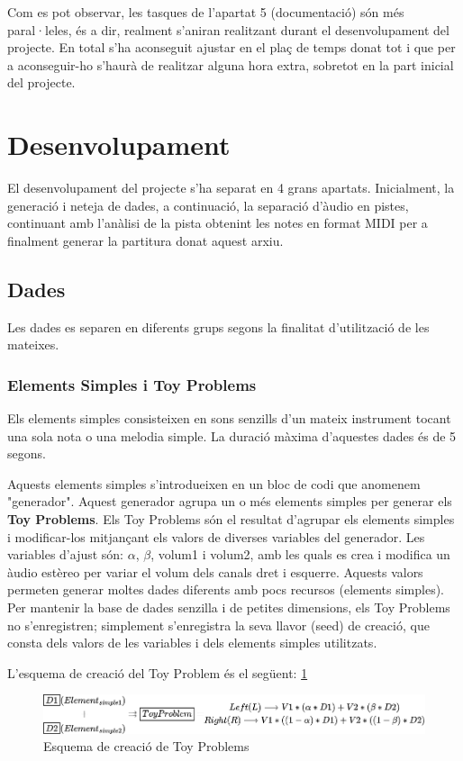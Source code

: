 \documentclass[10pt,a4paper,twocolumn,twoside]{article}
\begin{document}
Com es pot observar, les tasques de l'apartat 5 (documentació) són més paral·leles, és a dir, realment s'aniran realitzant durant el desenvolupament del projecte.
En total s'ha aconseguit ajustar en el plaç de temps donat tot i que per a aconseguir-ho s'haurà de realitzar alguna hora extra, sobretot en la part inicial del projecte.

\section{Desenvolupament}

El desenvolupament del projecte s'ha separat en 4 grans apartats. Inicialment, la generació i neteja de dades, a continuació, la separació d'àudio en pistes, continuant amb l'anàlisi de la pista obtenint les notes en format MIDI per a finalment generar la partitura donat aquest arxiu.

\subsection{Dades}
Les dades es separen en diferents grups segons la finalitat d'utilització de les mateixes.

\subsubsection{Elements Simples i Toy Problems}

Els elements simples consisteixen en sons senzills d'un mateix instrument tocant una sola nota o una melodia simple. La duració màxima d'aquestes dades és de 5 segons.

Aquests elements simples s'introdueixen en un bloc de codi que anomenem "generador". Aquest generador agrupa un o més elements simples per generar els \textbf{Toy Problems}. Els Toy Problems són el resultat d'agrupar els elements simples i modificar-los mitjançant els valors de diverses variables del generador. Les variables d'ajust són: \(\alpha\), \(\beta\), volum1 i volum2, amb les quals es crea i modifica un àudio estèreo per variar el volum dels canals dret i esquerre. Aquests valors permeten generar moltes dades diferents amb pocs recursos (elements simples). Per mantenir la base de dades senzilla i de petites dimensions, els Toy Problems no s'enregistren; simplement s'enregistra la seva llavor (seed) de creació, que consta dels valors de les variables i dels elements simples utilitzats.

L'esquema de creació del Toy Problem és el següent: \ref{fig:data-generator-formula}
\begin{figure}[h]
    \centering
    \includegraphics[width=1\linewidth]{img/data_generator_formula.png}
    \caption{Esquema de creació de Toy Problems}
    \label{fig:data-generator-formula}
\end{figure}
\end{document}
